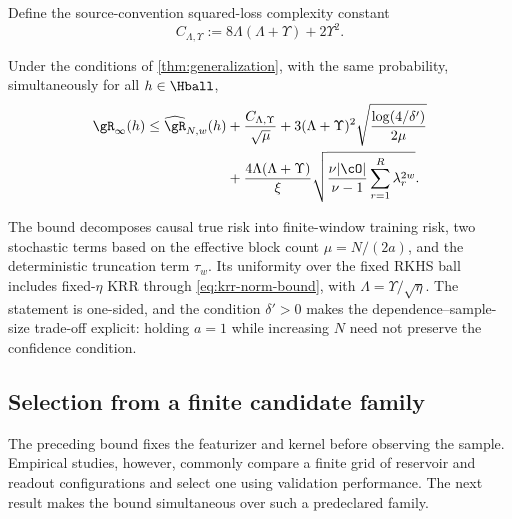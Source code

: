 Define the source-convention squared-loss complexity constant
\begin{equation}
    C_{\Lambda,\Upsilon}
    :=8\Lambda(\Lambda+\Upsilon)+2\Upsilon^2.
    \label{eq:loss-complexity-constant}
\end{equation}

\begin{corollary}
\label{cor:closed-generalization}
Under the conditions of \cref{thm:generalization}, with the same probability,
simultaneously for all \(h\in\Hball\),
\begin{align}
    \risk_\infty(h)
    \leq\erisk_{N,w}(h)
    &+\frac{C_{\Lambda,\Upsilon}}{\sqrt{\mu}}
    +3(\Lambda+\Upsilon)^2
      \sqrt{\frac{\log(4/\delta')}{2\mu}}
    \notag\\
    &+
    \frac{4\Lambda(\Lambda+\Upsilon)}{\xi}
    \sqrt{
      \frac{\nu|\cO|}{\nu-1}
      \sum_{r=1}^R\lambda_r^{2w}
    }.
    \label{eq:closed-generalization}
\end{align}
\end{corollary}

The bound decomposes causal true risk into finite-window training risk, two
stochastic terms based on the effective block count
\(\mu=N/(2a)\), and the deterministic truncation term \(\tau_w\). Its
uniformity over the fixed RKHS ball includes fixed-\(\eta\) KRR through
\cref{eq:krr-norm-bound}, with \(\Lambda=\Upsilon/\sqrt\eta\). The statement is
one-sided, and the condition \(\delta'>0\) makes the dependence--sample-size
trade-off explicit: holding \(a=1\) while increasing \(N\) need not preserve
the confidence condition.

\subsection{Selection from a finite candidate family}

The preceding bound fixes the featurizer and kernel before observing the
sample. Empirical studies, however, commonly compare a finite grid of reservoir
and readout configurations and select one using validation performance. The
next result makes the bound simultaneous over such a predeclared family.

